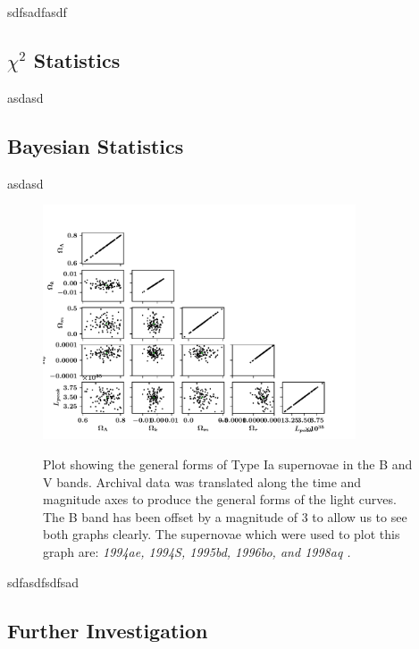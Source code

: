 \documentclass[twocolumn]{revtex4}
\begin{document}
sdfsadfasdf

\vspace{-3ex}
\subsection{$\chi^2$ Statistics} 
\vspace{-2ex}

asdasd

\vspace{-3ex}
\subsection{Bayesian Statistics} 
\vspace{-2ex}

asdasd


\begin{figure}[!h]
\begin{center}
\includegraphics[width=9.25cm]{results/triangle}
\caption[]{Plot showing the general forms of Type Ia supernovae in the B and V bands. Archival data was translated along the time and magnitude axes to produce the general forms of the light curves. The B band has been offset by a magnitude of $3$ to allow us to see both graphs clearly. The supernovae which were used to plot this graph are: \em{1994ae, 1994S, 1995bd, 1996bo, }\em  and \em{1998aq }\em \cite{jha, matheson}. }
\vspace{-3ex}
\label{fig:triangle}
\end{center}
\end{figure}

\lipsum
\lipsum
\lipsum
\lipsum
\lipsum
\lipsum[3-6]

sdfasdfsdfsad

\vspace{-3ex}
\subsection{Further Investigation} 
\vspace{-2ex}
\end{document}
